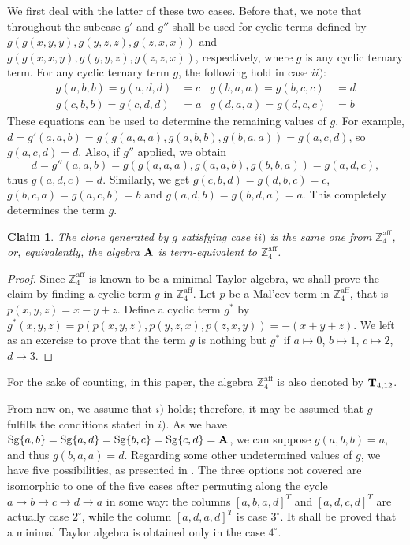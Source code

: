 \documentclass[11pt]{amsart}
\newcommand{\m}[1]{\mathbf{\uppercase{#1}}}
\theoremstyle{definition}
\theoremstyle{remark}
\theoremstyle{plain}
\newtheorem{claim}[thm]{Claim}
\begin{document}
\begin{enumerate}[wide, labelindent=0pt]
\begin{enumerate}[wide, labelindent=0pt]
    We first deal with the latter of these two cases. Before that, we note that throughout the subcase $g'$ and $g''$ shall be used for cyclic terms defined by $g(g(x,y,y),g(y,z,z),g(z,x,x))$ and $g(g(x,x,y),g(y,y,z),g(z,z,x))$, respectively, where $g$ is any cyclic ternary term. For any cyclic ternary term $g$, the following hold in case $ii)$:
    \begin{align*}
        g(a,b,b)=g(a,d,d)&=c  &  g(b,a,a)=g(b,c,c)&=d\\
         g(c,b,b)=g(c,d,d)&=a  &  g(d,a,a)=g(d,c,c)&=b
    \end{align*}
    These equations can be used to determine the remaining values of $g$. For example, $d=g'(a,a,b)=g(g(a,a,a),g(a,b,b),g(b,a,a))=g(a,c,d)$, so $g(a,c,d)=d$. Also, if $g''$ applied, we obtain $$d=g''(a,a,b)=g(g(a,a,a),g(a,a,b),g(b,b,a))=g(a,d,c),$$ thus $g(a,d,c)=d$. Similarly, we get $g(c,b,d)=g(d,b,c)=c$, $g(b,c,a)=g(a,c,b)=b$ and $g(a,d,b)=g(b,d,a)=a$. This completely determines the term $g$.

    \begin{claim}
    The clone generated by $g$ satisfying case $ii)$ is the same one from $\mathbb{Z}_4^{\mathrm{aff}}$, or, equivalently, the algebra $\m a$ is term-equivalent to $\mathbb{Z}_4^{\mathrm{aff}}$.
    \end{claim}
    \begin{proof}
    Since $\mathbb{Z}_4^{\mathrm{aff}}$ is known to be a minimal Taylor algebra, we shall prove the claim by finding a cyclic term $g$ in $\mathbb{Z}_4^{\mathrm{aff}}$. Let $p$ be a Mal'cev term in $\mathbb{Z}_4^{\mathrm{aff}}$, that is $p(x,y,z)=x-y+z$. Define a cyclic term $g^*$ by $g^*(x,y,z)=p(p(x,y,z),p(y,z,x),p(z,x,y))=-(x+y+z)$. We left as an exercise to prove that the term $g$ is nothing but $g^*$ if $a\mapsto 0$, $b\mapsto 1$, $c\mapsto 2$, $d\mapsto 3$.
    \end{proof}
    For the sake of counting, in this paper, the algebra $\mathbb{Z}_4^{\mathrm{aff}}$ is also denoted by $\m t_{4,12}$.

    From now on, we assume that $i)$ holds; therefore, it may be assumed that $g$ fulfills the conditions stated in $i)$. As we have $\mathrm{Sg}\{a,b\}=\mathrm{Sg}\{a,d\}=\mathrm{Sg}\{b,c\}=\mathrm{Sg}\{c,d\}=\m a$, we can suppose $g(a,b,b)=a$, and thus $g(b,a,a)=d$. Regarding some other undetermined values of $g$, we have five possibilities, as presented in . The three options not covered are isomorphic to one of the five cases after permuting along the cycle $a\rightarrow b\rightarrow c\rightarrow d\rightarrow a$ in some way: the columns $[a,b,a,d]^T$ and $[a,d,c,d]^T$ are actually case $2^\circ$, while the column $[a,d,a,d]^T$ is case $3^\circ$. It shall be proved that a minimal Taylor algebra is obtained only in the case $4^{\circ}$.


\end{enumerate}
\end{enumerate}
\end{document}
